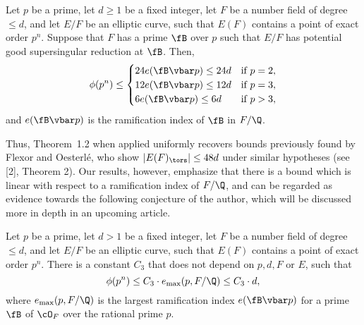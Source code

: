 \begin{thm} %
Let $p$ be a prime, let $d \geq 1$ be a fixed integer, let $F$ be a number field of degree $\leq d$, and let $E/F$ be an elliptic curve, such that $E(F)$ contains a point of exact order $p^n$. Suppose that $F$ has a prime $\fB$ over $p$ such that $E/F$ has potential good supersingular reduction at $\fB$. Then, 
	\[
	\phi(p^n) \leq
	\begin{cases}
	24e(\fB \vbar p) \leq 24d & \text{if } p= 2, \\
	12e(\fB \vbar p) \leq 12d & \text{if } p= 3, \\
	6e(\fB \vbar p) \leq 6d & \text{if } p > 3,
	\end{cases}
	\]
and $e(\fB \vbar p)$ is the ramification index of $\fB$ in $F/\Q$. 
\end{thm}


Thus, Theorem~1.2 when applied uniformly recovers bounds previously found by Flexor and Oesterl\'e, who show $|E(F)_\tors| \leq 48d$ under similar hypotheses (see [2], Theorem 2). Our results, however, emphasize that there is a bound which is linear with respect to a ramification index of $F/\Q$, and can be regarded as evidence towards the following conjecture of the author, which will be discussed more in depth in an upcoming article.


\begin{conj} %
Let $p$ be a prime, let $d > 1$ be a fixed integer, let $F$ be a number field of degree $\leq d$, and let $E/F$ be an elliptic curve, such that $E(F)$ contains a point of exact order $p^n$. There is a constant $C_3$ that does not depend on $p, d, F$ or $E$, such that
	\[
	\phi(p^n) \leq C_3 \cdot e_{\max}(p,F/\Q) \leq C_3 \cdot d,
	\]
where $e_{\max}(p,F/\Q)$ is the largest ramification index $e(\fB \vbar p)$ for a prime $\fB$ of $\cO_F$ over the rational prime $p$. 
\end{conj}








